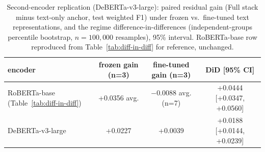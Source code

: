 \begin{table}[t]
\centering
\caption{Second-encoder replication (DeBERTa-v3-large): paired residual gain (Full stack minus text-only anchor, test weighted F1) under frozen vs.\ fine-tuned text representations, and the regime difference-in-differences (independent-groups percentile bootstrap, $n{=}100{,}000$ resamples), 95\% interval. RoBERTa-base row reproduced from Table~\ref{tab:diff-in-diff} for reference, unchanged.}
\label{tab:diff-in-diff-deberta-large}
\begin{tabular}{lccc}
\toprule
encoder & frozen gain (n=3) & fine-tuned gain (n=3) & DiD [95\% CI] \\
\midrule
RoBERTa-base (Table~\ref{tab:diff-in-diff}) & +0.0356 avg. & $-$0.0088 avg. (n=7) & +0.0444 [+0.0347, +0.0560] \\
DeBERTa-v3-large & +0.0227 & +0.0039 & +0.0188 [+0.0144, +0.0239] \\
\bottomrule
\end{tabular}
\end{table}

